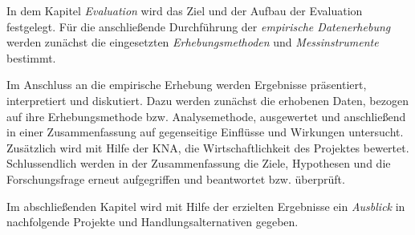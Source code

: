 In dem Kapitel \textit{Evaluation} wird das Ziel und der Aufbau der Evaluation festgelegt. Für die anschließende Durchführung der \textit{empirische Datenerhebung} werden zunächst die eingesetzten \textit{Erhebungsmethoden} und \textit{Messinstrumente} bestimmt.

Im Anschluss an die empirische Erhebung werden Ergebnisse präsentiert, interpretiert und diskutiert. Dazu werden zunächst die erhobenen Daten, bezogen auf ihre Erhebungsmethode bzw. Analysemethode, ausgewertet und anschließend in einer Zusammenfassung auf gegenseitige Einflüsse und Wirkungen untersucht. Zusätzlich wird mit Hilfe der \gls{KNA}, die Wirtschaftlichkeit des Projektes bewertet. Schlussendlich werden in der Zusammenfassung die Ziele, Hypothesen und die Forschungsfrage erneut aufgegriffen und beantwortet bzw. überprüft.

Im abschließenden Kapitel wird mit Hilfe der erzielten Ergebnisse ein \textit{Ausblick} in nachfolgende Projekte und Handlungsalternativen gegeben.



